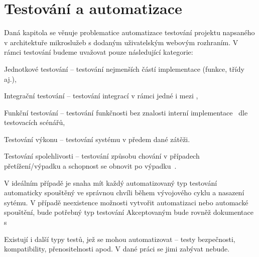 
\section{Testování a automatizace}

Daná kapitola se věnuje problematice automatizace testování projektu napsaného v architektuře mikroslužeb s dodaným uživatelským webovým rozhraním.
V rámci testování budeme uvažovat pouze následující kategorie:

\begin{dl}
   \item[Jednotkové testování] – testování nejmenších částí implementace (funkce, třídy aj.),
   \item[Integrační testování] – testování integrací v rámci jedné  i mezi ,
   \item[Funkční testování] – testování funkčnosti bez znalosti interní implementace~\cite{testtypes} dle testovacích scénářů,
   \item[Testování výkonu] – testování systému v předem dané zátěži.
   \item[Testování spolehlivosti] – testování způsobu chování v případech přetížení/výpadku a schopnost se obnovit po výpadku~\cite{testtypes2}.
\end{dl}

V ideálním případě je snaha mít každý automatizovaný typ testování automaticky spouštěný ve správnou chvíli během vývojového cyklu a nasazení sytému.
V případě neexistence možnosti vytvořit automatizaci nebo automacké spouštění, bude potřebný typ testování
Akceptovaným bude rovněž dokumentace s


Existují i další typy testů, jež se mohou automatizovat – testy bezpečnosti, kompatibility, přenositelnosti apod.
V dané práci se jimi zabývat nebude.

